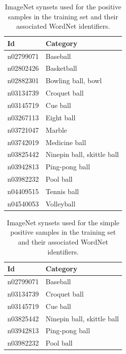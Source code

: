 \documentclass{sig-alternate-05-2015}
\begin{document}
{{			\begin{table}
				\centering
				\caption{ImageNet synsets used for the positive samples in the training set and their associated WordNet identifiers.}
				\label{tab:positive_samples}
				\begin{tabularx}{\columnwidth}{@{}lX@{}}
					\toprule
					\textbf{Id} & \textbf{Category} \\
					\midrule
						n02799071 & Baseball \\
						n02802426 & Basketball \\
						n02882301 & Bowling ball, bowl \\
						n03134739 & Croquet ball \\
						n03145719 & Cue ball \\
						n03267113 & Eight ball \\
						n03721047 & Marble \\
						n03742019 & Medicine ball \\
						n03825442 & Ninepin ball, skittle ball \\
						n03942813 & Ping-pong ball \\
						n03982232 & Pool ball \\
						n04409515 & Tennis ball \\
						n04540053 & Volleyball \\
					\bottomrule
				\end{tabularx}
			\end{table}

			\begin{table}
				\centering
				\caption{ImageNet synsets used for the simple positive samples in the training set and their associated WordNet identifiers.}
				\label{tab:positive_samples_simple}
				\begin{tabularx}{\columnwidth}{@{}lX@{}}
					\toprule
					\textbf{Id} & \textbf{Category} \\
					\midrule
						n02799071 & Baseball \\
						n03134739 & Croquet ball \\
						n03145719 & Cue ball \\
						n03825442 & Ninepin ball, skittle ball \\
						n03942813 & Ping-pong ball \\
						n03982232 & Pool ball \\
					\bottomrule
				\end{tabularx}
			\end{table}

}}
\end{document}
